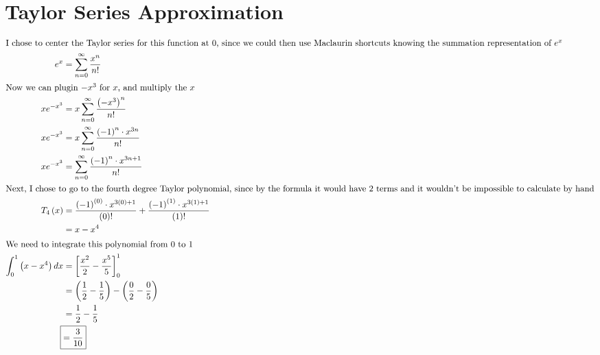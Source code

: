 \documentclass[12pt]{article}
\begin{document}
\section{Taylor Series Approximation}
\begin{align}
  \intertext{I chose to center the Taylor series for this function at $0$, since we could then use Maclaurin shortcuts knowing the summation representation of $e^x$}
  e^{x}                              & =\sum_{n=0}^{\infty}\frac{x^{n}}{n!}                                                                                                                                     \\
  \intertext{Now we can plugin $-x^3$ for $x$, and multiply the $x$}
  xe^{-x^{3}}                        & =x\sum_{n=0}^{\infty}\frac{\left(-x^{3}\right)^{n}}{n!}                                                                                                                  \\
  xe^{-x^{3}}                        & =x\sum_{n=0}^{\infty}\frac{\left(-1\right)^{n}\cdot x^{3n}}{n!}                                                                                                       \\
  xe^{-x^{3}}                        & =\sum_{n=0}^{\infty}\frac{\left(-1\right)^{n}\cdot x^{3n+1}}{n!}                                                                                                         \\
  \intertext{Next, I chose to go to the fourth degree Taylor polynomial, since by the formula it would have $2$ terms and it wouldn't be impossible to calculate by hand}
  T_{4}\left(x\right)                & =\frac{\left(-1\right)^{\left(0\right)}\cdot x^{3\left(0\right)+1}}{\left(0\right)!}+\frac{\left(-1\right)^{\left(1\right)}\cdot x^{3\left(1\right)+1}}{\left(1\right)!} \\
                                     & =x-x^{4}                                                                                                                                                                 \\
  \intertext{We need to integrate this polynomial from $0$ to $1$}
  \int_{0}^{1}\left(x-x^{4}\right)dx & =\left[\frac{x^{2}}{2}-\frac{x^{5}}{5}\right]_{0}^{1}                                                                                                                    \\
                                     & =\left(\frac{1}{2}-\frac{1}{5}\right)-\left(\frac{0}{2}-\frac{0}{5}\right)                                                                                               \\
                                     & =\frac{1}{2}-\frac{1}{5}                                                                                                                                                 \\
                                     \Aboxed{& =\frac{3}{10}}                                                                                                                                                            
\end{align}
\end{document}
